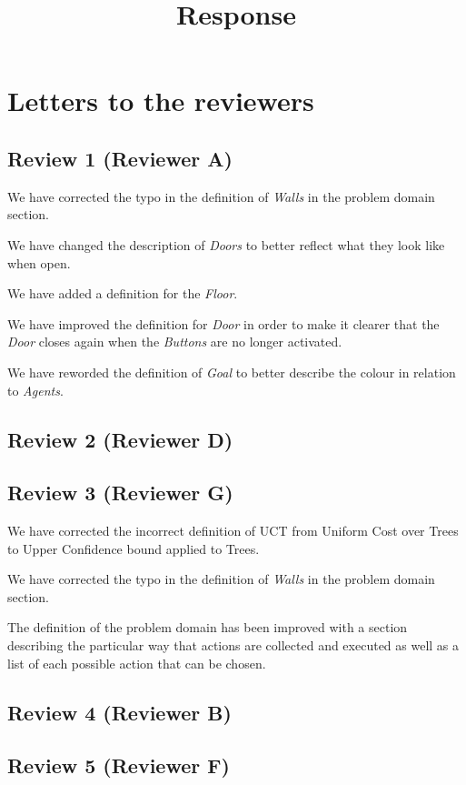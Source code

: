 \documentclass{article}
\title{Response}
\begin{document}
\maketitle
\section{Letters to the reviewers}
\subsection{Review 1 (Reviewer A)}
We have corrected the typo in the definition of \emph{Walls} in the problem domain section.

We have changed the description of \emph{Doors} to better reflect what they look like when open.

We have added a definition for the \emph{Floor}.

We have improved the definition for \emph{Door} in order to make it clearer that the \emph{Door} closes again when the \emph{Buttons} are no longer activated.

We have reworded the definition of \emph{Goal} to better describe the colour in relation to \emph{Agents}.
\subsection{Review 2 (Reviewer D)}
\subsection{Review 3 (Reviewer G)}
We have corrected the incorrect definition of UCT from Uniform Cost over Trees to Upper Confidence bound applied to Trees.

We have corrected the typo in the definition of \emph{Walls} in the problem domain section.

The definition of the problem domain has been improved with a section describing the particular way that actions are collected and executed as well as a list of each possible action that can be chosen.
\subsection{Review 4 (Reviewer B)}
\subsection{Review 5 (Reviewer F)}
\end{document}
